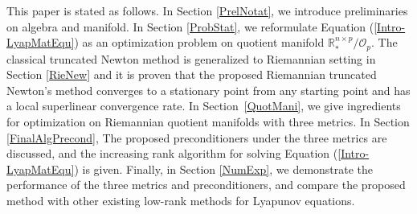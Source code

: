 \documentclass[11pt]{article}
\numberwithin{equation}{section}
\begin{document}
This paper is stated as follows. In Section \ref{PrelNotat}, we introduce preliminaries on algebra and manifold. In Section \ref{ProbStat}, we reformulate Equation (\ref{Intro-LyapMatEqu}) as an optimization problem on quotient manifold $\mathbb{R}_*^{n\times p}/\mathcal{O}_p$. The classical truncated Newton method is generalized to Riemannian setting in Section \ref{RieNew} and it is proven that the proposed Riemannian truncated Newton's method converges to a stationary point from any starting point and has a local superlinear convergence rate. In Section~\ref{QuotMani}, we give ingredients for optimization on Riemannian quotient manifolds with three metrics. In Section \ref{FinalAlgPrecond}, The proposed preconditioners under the three metrics are discussed, and the increasing rank algorithm for solving Equation (\ref{Intro-LyapMatEqu}) is given. Finally, in Section \ref{NumExp}, we demonstrate the performance of the three metrics and preconditioners, and compare the proposed method with other existing low-rank methods for Lyapunov equations. 





\end{document}
